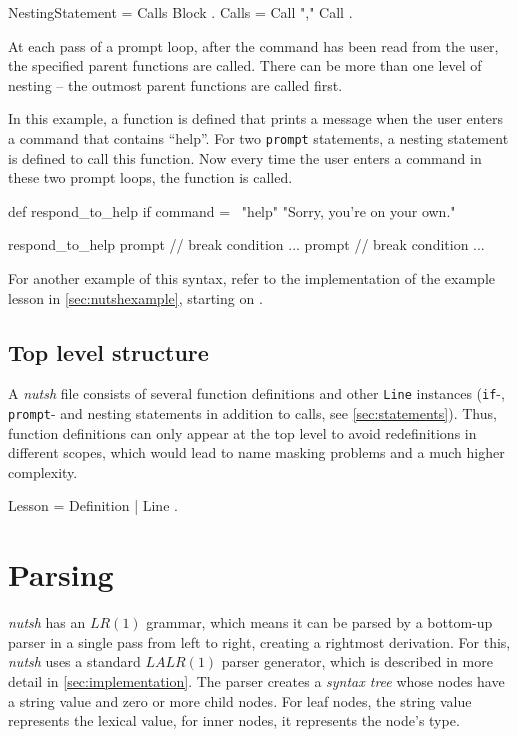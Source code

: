 \documentclass[paper=a4,twoside,abstract=on,cleardoublepage=empty,numbers=noenddot,toc=bib,12pt,appendixprefix=true]{scrreprt}
\begin{document}
\begin{ebnf}
NestingStatement = Calls Block .
Calls = Call { "," Call } .
\end{ebnf}
%
At each pass of a prompt loop, after the command has been read from the user, the specified parent functions are called. There can be more than one level of nesting -- the outmost parent functions are called first.

In this example, a function is defined that prints a message when the user enters a command that contains “help”. For two \texttt{prompt} statements, a nesting statement is defined to call this function. Now every time the user enters a command in these two prompt loops, the function is called.

\begin{nutsh}
def respond_to_help {
    if command =~ "help" {
        "Sorry, you're on your own."
    }
}

respond_to_help {
    prompt {
        // break condition ...
    }
    prompt {
        // break condition ...
    }
}
\end{nutsh}
%
For another example of this syntax, refer to the implementation of the example lesson in \cref{sec:nutshexample}, starting on .

\subsection{Top level structure}

A \emph{nutsh} file consists of several function definitions and other \texttt{Line} instances (\texttt{if}-, \texttt{prompt}- and nesting statements in addition to calls, see \cref{sec:statements}). Thus, function definitions can only appear at the top level to avoid redefinitions in different scopes, which would lead to name masking problems and a much higher complexity.

\begin{ebnf}
Lesson = { Definition | Line } .
\end{ebnf}

\section{Parsing}

\emph{nutsh} has an $LR(1)$ grammar, which means it can be parsed by a bottom-up parser in a single pass from left to right, creating a rightmost derivation. For this, \emph{nutsh} uses a standard $LALR(1)$ parser generator, which is described in more detail in \cref{sec:implementation}.
The parser creates a \emph{syntax tree} whose nodes have a string value and zero or more child nodes. For leaf nodes, the string value represents the lexical value, for inner nodes, it represents the node's type.
\end{document}
